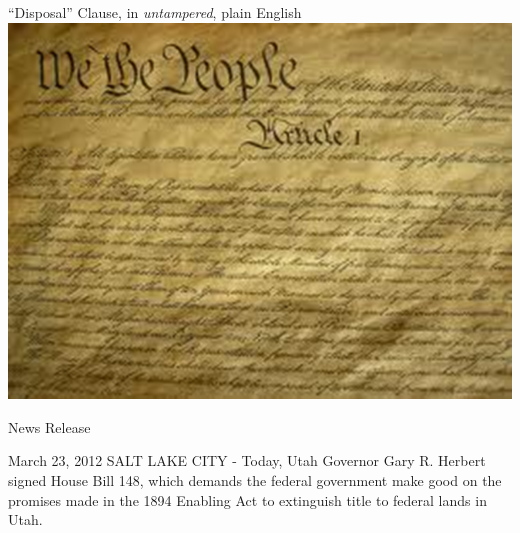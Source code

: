 \begin{frame}{``Disposal'' Clause, in \emph{untampered}, plain English}
   \centering
   \includegraphics[height=.7\textheight]{img/constitution.png} \\
\end{frame}

\begin{frame}{News Release}
    \begin{block}{March 23, 2012}
    SALT LAKE CITY - Today, Utah Governor Gary R. Herbert signed House Bill
    148, which demands the federal government make good on the promises made in
    the 1894 Enabling Act to extinguish title to federal lands in Utah. 
    \end{block}
\end{frame}

